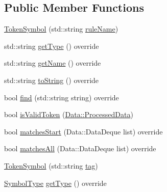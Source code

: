 \subsection*{Public Member Functions}
\begin{DoxyCompactItemize}
\item 
\mbox{\hyperlink{class_erable_1_1_compiler_1_1_symbols_1_1_token_symbol_a4c1e8ae7336204598cc0f614a9edbb26}{Token\+Symbol}} (std\+::string \mbox{\hyperlink{class_erable_1_1_compiler_1_1_symbols_1_1_token_symbol_aedef0a5b3fef634067b62c93934ecb08}{rule\+Name}})
\item 
std\+::string \mbox{\hyperlink{class_erable_1_1_compiler_1_1_symbols_1_1_token_symbol_af74e0413d933d950bcf47d7ab568d20f}{get\+Type}} () override
\item 
std\+::string \mbox{\hyperlink{class_erable_1_1_compiler_1_1_symbols_1_1_token_symbol_a2d9a65967a330721741d7f13ec299745}{get\+Name}} () override
\item 
std\+::string \mbox{\hyperlink{class_erable_1_1_compiler_1_1_symbols_1_1_token_symbol_a0f8499152ff070ae70295c9b25b25b93}{to\+String}} () override
\item 
bool \mbox{\hyperlink{class_erable_1_1_compiler_1_1_symbols_1_1_token_symbol_ad1946e481bf759d24425afbd869248fd}{find}} (std\+::string string) override
\item 
bool \mbox{\hyperlink{class_erable_1_1_compiler_1_1_symbols_1_1_token_symbol_af55a8939414a0b0ddf7302f6eb0cc77e}{is\+Valid\+Token}} (\mbox{\hyperlink{struct_erable_1_1_compiler_1_1_data_1_1_processed_data}{Data\+::\+Processed\+Data}})
\item 
bool \mbox{\hyperlink{class_erable_1_1_compiler_1_1_symbols_1_1_token_symbol_a0bc1350eeca0c23ef97f454589734ede}{matches\+Start}} (Data\+::\+Data\+Deque list) override
\item 
bool \mbox{\hyperlink{class_erable_1_1_compiler_1_1_symbols_1_1_token_symbol_a89e31223762aafe7f77d545595a6e4ef}{matches\+All}} (Data\+::\+Data\+Deque list) override
\item 
\mbox{\hyperlink{class_erable_1_1_compiler_1_1_symbols_1_1_token_symbol_ab51824e15de1ea042f34b365b8becc89}{Token\+Symbol}} (std\+::string \mbox{\hyperlink{class_erable_1_1_compiler_1_1_symbols_1_1_symbol_a09df8dce9bee3576451b880fc651506d}{tag}})
\item 
\mbox{\hyperlink{namespace_erable_1_1_compiler_1_1_symbols_a3b60ec10cda0920ec4368128361b8320}{Symbol\+Type}} \mbox{\hyperlink{class_erable_1_1_compiler_1_1_symbols_1_1_token_symbol_a2cb212d21b563d12f1ac1a823e047bfe}{get\+Type}} () override

\end{DoxyCompactItemize}
